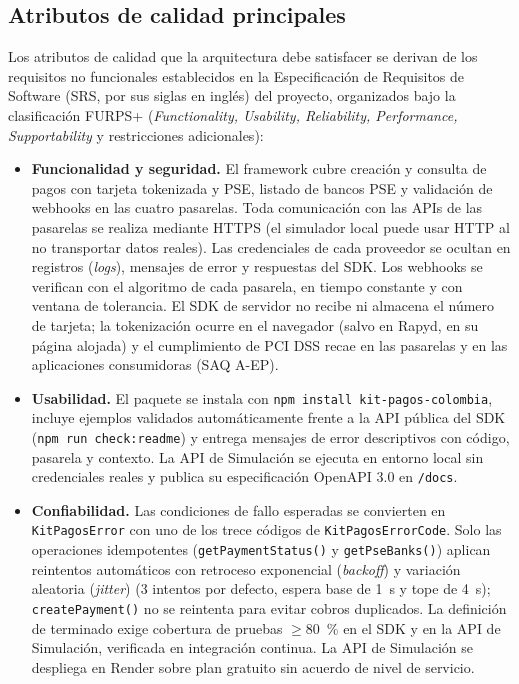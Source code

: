 \subsection{Atributos de calidad principales}
Los atributos de calidad que la arquitectura debe satisfacer se derivan de los requisitos no funcionales establecidos en la Especificación de Requisitos de Software (SRS, por sus siglas en inglés) del proyecto, organizados bajo la clasificación FURPS+ (\textit{Functionality, Usability, Reliability, Performance, Supportability} y restricciones adicionales):

\begin{itemize}
    \item \textbf{Funcionalidad y seguridad.} El framework cubre creación y consulta de pagos con tarjeta tokenizada y PSE, listado de bancos PSE y validación de webhooks en las cuatro pasarelas. Toda comunicación con las APIs de las pasarelas se realiza mediante HTTPS (el simulador local puede usar HTTP al no transportar datos reales). Las credenciales de cada proveedor se ocultan en registros (\textit{logs}), mensajes de error y respuestas del SDK. Los webhooks se verifican con el algoritmo de cada pasarela, en tiempo constante y con ventana de tolerancia. El SDK de servidor no recibe ni almacena el número de tarjeta; la tokenización ocurre en el navegador (salvo en Rapyd, en su página alojada) y el cumplimiento de PCI DSS recae en las pasarelas y en las aplicaciones consumidoras (SAQ A-EP).
    \item \textbf{Usabilidad.} El paquete se instala con \texttt{npm install kit-pagos-colombia}, incluye ejemplos validados automáticamente frente a la API pública del SDK (\texttt{npm run check:readme}) y entrega mensajes de error descriptivos con código, pasarela y contexto. La API de Simulación se ejecuta en entorno local sin credenciales reales y publica su especificación OpenAPI 3.0 en \texttt{/docs}.
    \item \textbf{Confiabilidad.} Las condiciones de fallo esperadas se convierten en \texttt{KitPagosError} con uno de los trece códigos de \texttt{KitPagosErrorCode}. Solo las operaciones idempotentes (\texttt{getPaymentStatus()} y \texttt{getPseBanks()}) aplican reintentos automáticos con retroceso exponencial (\textit{backoff}) y variación aleatoria (\textit{jitter}) (3 intentos por defecto, espera base de 1~s y tope de 4~s); \texttt{createPayment()} no se reintenta para evitar cobros duplicados. La definición de terminado exige cobertura de pruebas $\ge 80$~\% en el SDK y en la API de Simulación, verificada en integración continua. La API de Simulación se despliega en Render sobre plan gratuito sin acuerdo de nivel de servicio.

\end{itemize}
